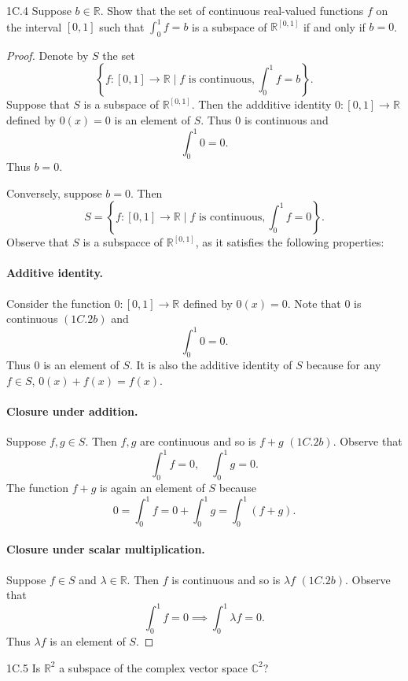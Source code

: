 \documentclass{exam}
\newcommand{\curly}[1]{\left\{#1\right\}}
\begin{document}
\begin{problem}{1C.4}
    Suppose $b\in\mathbb R$. Show that the set of continuous real-valued functions $f$ on the interval $[0, 1]$ such that $\int_0^1f = b$ is a subspace of $\mathbb R^{[0, 1]}$ if and only if $b = 0$.
\end{problem}

\begin{proof}
    Denote by $S$ the set \[
        \curly{f: [0, 1]\to\mathbb R\mid f\text{ is continuous},\int_0^1 f = b}.
    \]
    Suppose that $S$ is a subspace of $\mathbb R^{[0, 1]}$. Then the addditive identity $0:[0, 1]\to\mathbb R$ defined by $0(x) = 0$ is an element of $S$. Thus $0$ is continuous and \[
        \int_0^1 0 = 0.
    \]
    Thus $b = 0$.

    Conversely, suppose $b = 0$. Then \[
        S = \curly{f:[0, 1]\to\mathbb R\mid f\text{ is continuous},\int_0^1 f = 0}.
    \]
    Observe that $S$ is a subspacce of $\mathbb R^{[0, 1]}$, as it satisfies the following properties:
    \paragraph{Additive identity.} Consider the function $0:[0, 1]\to\mathbb R$ defined by $0(x) = 0$. Note that $0$ is continuous $(1C.2b)$ and \[
        \int_0^1 0 = 0.
    \]
    Thus $0$ is an element of $S$. It is also the additive identity of $S$ because for any $f\in S$, $0(x) + f(x) = f(x)$.

    \paragraph{Closure under addition.} Suppose $f, g\in S$. Then $f, g$ are continuous and so is $f + g$ $(1C.2b)$. Observe that \[
        \int_0^1 f = 0,\quad\int_0^1 g = 0.
    \]
    The function $f + g$ is again an element of $S$ because \[
        0 = \int_0^1 f = 0 + \int_0^1 g = \int_0^1(f + g).
    \]

    \paragraph{Closure under scalar multiplication.} Suppose $f\in S$ and $\lambda\in\mathbb R$. Then $f$ is continuous and so is $\lambda f$ $(1C.2b)$. Observe that \[
        \int_0^1 f = 0 \implies \int_0^1\lambda f = 0.
    \]
    Thus $\lambda f$ is an element of $S$.
\end{proof}

\begin{problem}{1C.5}
    Is $\mathbb R^2$ a subspace of the complex vector space $\mathbb C^2$?
\end{problem}
\end{document}

